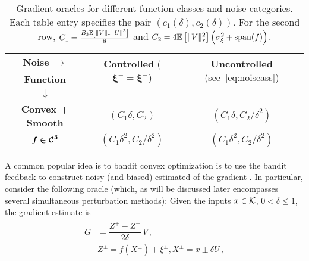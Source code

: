 \begin{table*}
\centering
\begin{tabular}{|c|c|c|}
\toprule
\textbf{Noise }$\bm{ \rightarrow}$ & \multirow{2}{*}{\textbf{Controlled }($\bm{\xi^+ = \xi^-}$)} & \multirow{2}{*}{\textbf{Uncontrolled }(see~\eqref{eq:noiseass})} \\ 
\textbf{Function } &&\\
$\bm{\downarrow}$ &&\\\midrule
\multirow{2}{*}{\textbf{Convex + Smooth}} & \multirow{2}{*}{$(C_1 \delta, C_2)$} & \multirow{2}{*}{$(C_1\delta, C_2/\delta^2)$}\\ 
 &&\\\midrule
\multirow{2}{*}{$\bm{f \in \mathcal{C}^3}$} & \multirow{2}{*}{$(C_1 \delta^2, C_2/\delta^2)$} & \multirow{2}{*}{$(C_1 \delta^2, C_2/\delta^2)$} \\ 
 &&\\\bottomrule
\end{tabular}
\caption{Gradient oracles for different function classes and noise categories. Each table entry specifies the pair $(c_1(\delta), c_2(\delta))$.
For the second row, $C_1 = \frac{B_3 \mathbb{E}\left[ \|V\|_* \|U\|^3 \right]}{8}$ and $C_2 = 4 \mathbb{E}\left[\|V\|_*^2\right]\left( \sigma_\xi^2+\operatorname{span}(f)\right)$.
}
\label{tab:oracles}
\end{table*}
A common popular idea is to bandit convex optimization is to use the bandit feedback to construct noisy (and biased) estimated of the gradient \cite{XXXXX}.
In particular, consider the following oracle (which, as will be discussed later 
 encompasses several simultaneous perturbation methods):
Given the inputs $x\in \mathcal{K}$,  $0<\delta\le 1$,  
the gradient estimate is
\begin{align}
\begin{split}
G &=  \dfrac{Z^+ - Z^-}{2\delta}\, V \,, \\
&  Z^{\pm} = f(X^{\pm}) + \xi^{\pm}, X^{\pm} = x \pm \delta U\,,
 \end{split}
 \label{eq:twosp}
\end{align}
